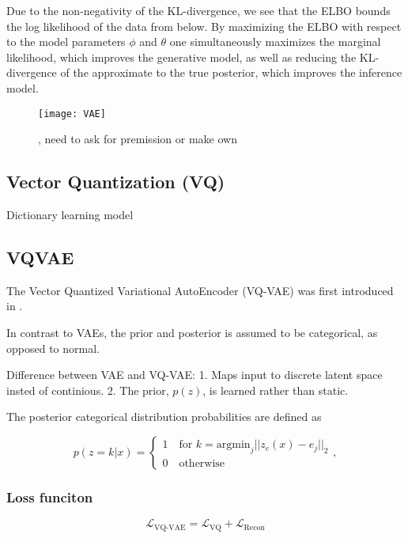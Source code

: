 \documentclass[../../thesis.tex]{subfiles}
\begin{document}
Due to the non-negativity of the KL-divergence, we see that the ELBO bounds the log likelihood of the data from below. By maximizing the ELBO with respect to the model parameters $\phi$ and $\theta$ one simultaneously maximizes the marginal likelihood, which improves the generative model, as well as reducing the KL-divergence of the approximate to the true posterior, which improves the inference model.



\begin{figure}[h]
    \texttt{[image: VAE]}
    \centering  
    \caption{\cite{VAE}, need to ask for premission or make own}  
\end{figure}

\subsection{Vector Quantization (VQ)}
Dictionary learning model

\subsection{VQVAE}
The Vector Quantized Variational AutoEncoder (VQ-VAE) was first introduced in \cite{VQVAE}. 

In contrast to VAEs, the prior and posterior is assumed to be categorical, as opposed to normal. 

Difference between VAE and VQ-VAE: 1. Maps input to discrete latent space insted of continious. 2. The prior, $p(z)$, is learned rather than static.

The posterior categorical distribution probabilities are defined as

\begin{equation}
    p(z=k | x) = 
    \begin{cases} 
        1 \quad \text{for }k = \textrm{argmin}_j||z_e(x) - e_j||_2 \\
        0 \quad \text{otherwise}
    \end{cases},
\end{equation}


\subsubsection{Loss funciton}
\begin{equation}
    \mathcal{L}_{\text{VQ-VAE}} = \mathcal{L}_{\text{VQ}} + \mathcal{L}_{\text{Recon}}
\end{equation}
\end{document}
